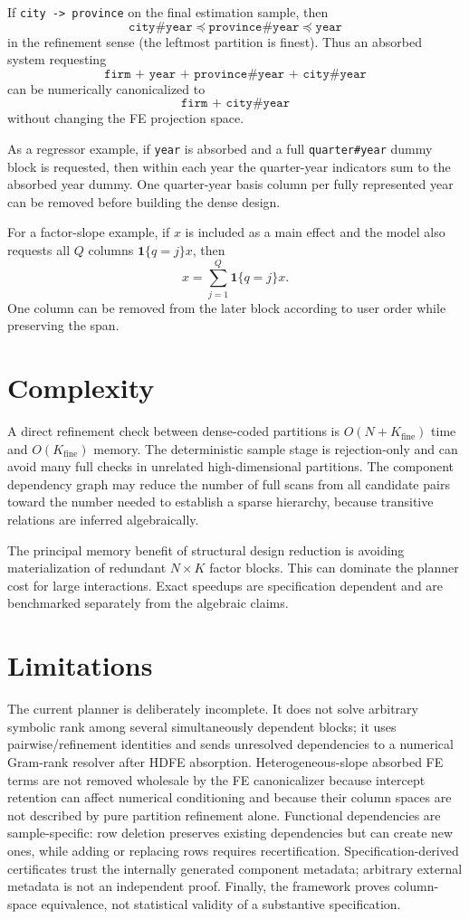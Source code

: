 \documentclass[11pt]{article}
\theoremstyle{definition}
\newcommand{\1}{\mathbf{1}}
\begin{document}
If \texttt{city -> province} on the final estimation sample, then
\[
 \texttt{city\#year} \preceq \texttt{province\#year} \preceq \texttt{year}
\]
in the refinement sense (the leftmost partition is finest). Thus an absorbed system requesting
\[
 \texttt{firm + year + province\#year + city\#year}
\]
can be numerically canonicalized to
\[
 \texttt{firm + city\#year}
\]
without changing the FE projection space.

As a regressor example, if \texttt{year} is absorbed and a full \texttt{quarter\#year} dummy block is requested, then within each year the quarter-year indicators sum to the absorbed year dummy. One quarter-year basis column per fully represented year can be removed before building the dense design.

For a factor-slope example, if $x$ is included as a main effect and the model also requests all $Q$ columns $\1\{q=j\}x$, then
\[
 x = \sum_{j=1}^{Q} \1\{q=j\}x.
\]
One column can be removed from the later block according to user order while preserving the span.

\section{Complexity}

A direct refinement check between dense-coded partitions is $O(N+K_{\text{fine}})$ time and $O(K_{\text{fine}})$ memory. The deterministic sample stage is rejection-only and can avoid many full checks in unrelated high-dimensional partitions. The component dependency graph may reduce the number of full scans from all candidate pairs toward the number needed to establish a sparse hierarchy, because transitive relations are inferred algebraically.

The principal memory benefit of structural design reduction is avoiding materialization of redundant $N\times K$ factor blocks. This can dominate the planner cost for large interactions. Exact speedups are specification dependent and are benchmarked separately from the algebraic claims.

\section{Limitations}

The current planner is deliberately incomplete. It does not solve arbitrary symbolic rank among several simultaneously dependent blocks; it uses pairwise/refinement identities and sends unresolved dependencies to a numerical Gram-rank resolver after HDFE absorption. Heterogeneous-slope absorbed FE terms are not removed wholesale by the FE canonicalizer because intercept retention can affect numerical conditioning and because their column spaces are not described by pure partition refinement alone. Functional dependencies are sample-specific: row deletion preserves existing dependencies but can create new ones, while adding or replacing rows requires recertification. Specification-derived certificates trust the internally generated component metadata; arbitrary external metadata is not an independent proof. Finally, the framework proves column-space equivalence, not statistical validity of a substantive specification.
\end{document}
